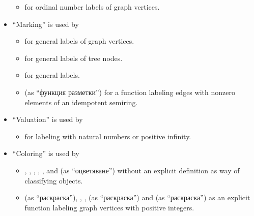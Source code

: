 \begin{remark}
\begin{itemize}
\begin{itemize}
      \item {} for ordinal number labels of graph vertices.
    \end{itemize}

    \item \enquote{Marking} is used by
    \begin{itemize}
      \item {} for general labels of graph vertices.

      \item {} for general labels of tree nodes.

      \item {} for general labels.

      \item {} (as \enquote{функция разметки}) for a function labeling edges with nonzero elements of an idempotent semiring.
    \end{itemize}

    \item \enquote{Valuation} is used by
    \begin{itemize}
      \item {} for labeling with natural numbers or positive infinity.
    \end{itemize}

    \item \enquote{Coloring} is used by
    \begin{itemize}
      \item {}, , , , ,  and  (as \enquote{оцветяване}) without an explicit definition as way of classifying objects.

      \item {} (as \enquote{раскраска}), , ,  (as \enquote{раскраска}) and  (as \enquote{раскраска}) as an explicit function labeling graph vertices with positive integers.


\end{itemize}
\end{itemize}
\end{remark}
